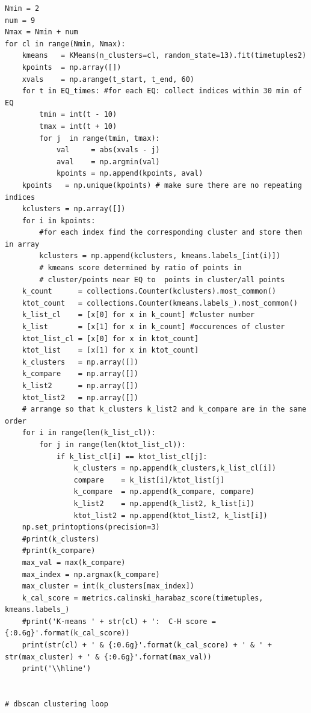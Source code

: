 \documentclass[colorlinks=true,pdfstartview=FitV,linkcolor=blue,
            citecolor=red,urlcolor=magenta]{ligodoc}
\begin{document}
\begin{verbatim}
Nmin = 2
num = 9
Nmax = Nmin + num  
for cl in range(Nmin, Nmax):
    kmeans   = KMeans(n_clusters=cl, random_state=13).fit(timetuples2)
    kpoints  = np.array([])
    xvals    = np.arange(t_start, t_end, 60)
    for t in EQ_times: #for each EQ: collect indices within 30 min of EQ
        tmin = int(t - 10)
        tmax = int(t + 10)
        for j  in range(tmin, tmax):
            val     = abs(xvals - j)
            aval    = np.argmin(val)
            kpoints = np.append(kpoints, aval)
    kpoints   = np.unique(kpoints) # make sure there are no repeating indices
    kclusters = np.array([])
    for i in kpoints:
        #for each index find the corresponding cluster and store them in array
        kclusters = np.append(kclusters, kmeans.labels_[int(i)])
        # kmeans score determined by ratio of points in
        # cluster/points near EQ to  points in cluster/all points
    k_count      = collections.Counter(kclusters).most_common()
    ktot_count   = collections.Counter(kmeans.labels_).most_common()
    k_list_cl    = [x[0] for x in k_count] #cluster number
    k_list       = [x[1] for x in k_count] #occurences of cluster
    ktot_list_cl = [x[0] for x in ktot_count]
    ktot_list    = [x[1] for x in ktot_count]
    k_clusters   = np.array([])
    k_compare    = np.array([])
    k_list2      = np.array([])
    ktot_list2   = np.array([])
    # arrange so that k_clusters k_list2 and k_compare are in the same order
    for i in range(len(k_list_cl)):
        for j in range(len(ktot_list_cl)):
            if k_list_cl[i] == ktot_list_cl[j]:
                k_clusters = np.append(k_clusters,k_list_cl[i])
                compare    = k_list[i]/ktot_list[j]
                k_compare  = np.append(k_compare, compare)
                k_list2    = np.append(k_list2, k_list[i])
                ktot_list2 = np.append(ktot_list2, k_list[i])
    np.set_printoptions(precision=3)
    #print(k_clusters)
    #print(k_compare)
    max_val = max(k_compare)
    max_index = np.argmax(k_compare)
    max_cluster = int(k_clusters[max_index])
    k_cal_score = metrics.calinski_harabaz_score(timetuples, kmeans.labels_)
    #print('K-means ' + str(cl) + ':  C-H score = {:0.6g}'.format(k_cal_score))
    print(str(cl) + ' & {:0.6g}'.format(k_cal_score) + ' & ' + str(max_cluster) + ' & {:0.6g}'.format(max_val))
    print('\\hline')


# dbscan clustering loop


\end{verbatim}
\end{document}
